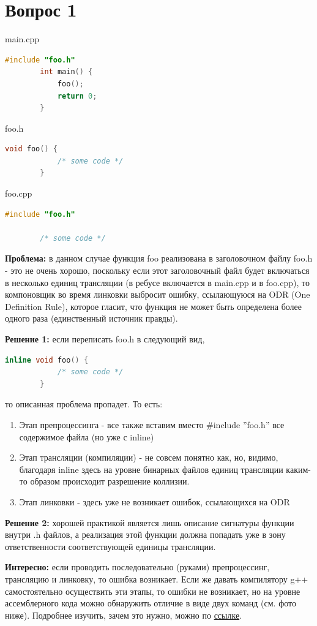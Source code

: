 \documentclass[12pt]{article}
\begin{document}
	\section*{Вопрос 1}
	
	main.cpp
	\begin{lstlisting}[language=C++]
		#include "foo.h"
		int main() {
			foo();
			return 0;
		}
	\end{lstlisting}
	foo.h
	\begin{lstlisting}[language=C++]
		void foo() {
			/* some code */
		}	
	\end{lstlisting}
	foo.cpp
	\begin{lstlisting}[language=C++]
		#include "foo.h"
		
		/* some code */
	\end{lstlisting}
	
	\textbf{Проблема:} в данном случае функция foo реализована в заголовочном файлу foo.h - это не очень хорошо, поскольку если этот заголовочный файл будет включаться в несколько единиц трансляции (в ребусе включается в main.cpp и в foo.cpp), то компоновщик во время линковки выбросит ошибку, ссылающуюся на ODR (One Definition Rule), которое гласит, что функция не может быть определена более одного раза (единственный источник правды).
	
	\textbf{Решение 1:} если переписать foo.h в следующий вид,
	\begin{lstlisting}[language=C++]
		inline void foo() {
			/* some code */
		}	
	\end{lstlisting}
	то описанная проблема пропадет. То есть:
	\begin{enumerate}
		\item Этап препроцессинга - все также вставим вместо \#include ''foo.h'' все содержимое файла (но уже с inline)
		\item Этап трансляции (компиляции) - не совсем понятно как, но, видимо, благодаря inline здесь на уровне бинарных файлов единиц трансляции каким-то образом происходит разрешение коллизии.
		\item Этап линковки - здесь уже не возникает ошибок, ссылающихся на ODR
	\end{enumerate}
	
	\textbf{Решение 2:} хорошей практикой является лишь описание сигнатуры функции внутри .h файлов, а реализация этой функции должна попадать уже в зону ответственности соответствующей единицы трансляции.
	
	\textbf{Интересно:} если проводить последовательно (руками) препроцессинг, трансляцию и линковку, то ошибка возникает. Если же давать компилятору g++ самостоятельно осуществить эти этапы, то ошибки не возникает, но на уровне ассемблерного кода можно обнаружить отличие в виде двух команд (см. фото ниже). Подробнее изучить, зачем это нужно, можно по \href{https://gcc.gnu.org/legacy-ml/gcc/2003-09/msg00984.html}{ссылке}.
	
\end{document}
